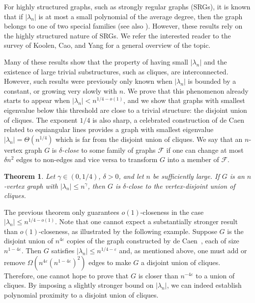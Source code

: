 \documentclass[11pt]{article}
\theoremstyle{plain}
\newtheorem{theorem}{Theorem}[section]
\theoremstyle{definition}
\newcommand{\cF}{\mathcal{F}}
\begin{document}
For highly structured graphs, such as strongly regular graphs (SRGs), it is known \cite{N79} that if $|\lambda_n|$ is at most a small polynomial of the average degree, then the graph belongs to one of two special families (see also \cite{KLMP}). However, these results rely on the highly structured nature of SRGs. We refer the interested reader to the survey of Koolen, Cao, and Yang \cite{KCY} for a general overview of the topic.

Many of these results show that the property of having small $|\lambda_n|$ and the existence of large trivial substructures, such as cliques, are interconnected. However, such results were previously only known when $|\lambda_n|$ is bounded by a constant, or growing very slowly with $n$. We prove that this phenomenon already starts to appear when $|\lambda_n|<n^{1/4-o(1)}$, and we show that graphs with smallest eigenvalue below this threshold are close to a trivial structure: the disjoint union of cliques. The exponent $1/4$ is also sharp, a celebrated construction of de Caen~\cite{deCaen} related to equiangular lines provides a graph with smallest eigenvalue $|\lambda_n|=\Theta(n^{1/4})$ which is far from the disjoint union of cliques. We say that an $n$-vertex graph $G$ is \emph{$\delta$-close} to some family of graphs $\cF$ if one can change at most $\delta n^2$ edges to non-edges and vice versa to transform $G$ into a member of $\cF$. 

\begin{theorem}\label{thm:MAIN_SE1}
Let $\gamma\in (0, 1/4)$, $\delta>0$, and let $n$ be sufficiently large. If $G$ is an $n$-vertex graph with $|\lambda_n|\leq n^{\gamma}$, then $G$ is $\delta$-close to the vertex-disjoint union of cliques. 
\end{theorem}

\noindent
The previous theorem only guarantees $o(1)$-closeness in the case $|\lambda_n|\le n^{1/4-o(1)}$. Note that one cannot expect a substantially stronger result than $o(1)$-closeness, as illustrated by the following example. Suppose $G$ is the disjoint union of $n^{4\varepsilon}$ copies of the graph constructed by de Caen~\cite{deCaen}, each of size $n^{1-4\varepsilon}$. Then $G$ satisfies $|\lambda_n|\le n^{1/4-\varepsilon}$ and, as mentioned above, one must add or remove $\Omega(n^{4\varepsilon}(n^{1-4\varepsilon})^2)$ edges to make $G$ a disjoint union of cliques. Therefore, one cannot hope to prove that $G$ is closer than $n^{-4\varepsilon}$ to a union of cliques. By imposing a slightly stronger bound on $|\lambda_n|$, we can indeed establish polynomial proximity to a disjoint union of cliques.
\end{document}
